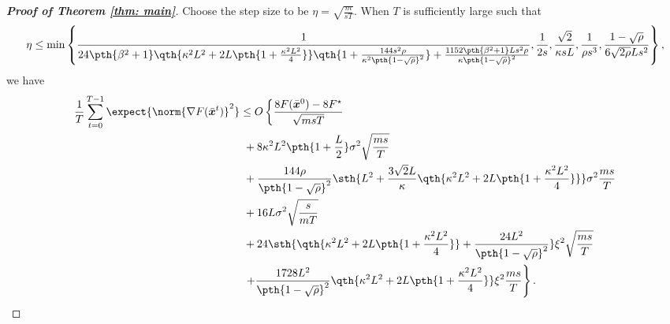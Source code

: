 \documentclass[letterpaper, 10 pt, conference]{ieeeconf}  %
\newcommand{\x}{{\bm x}}
\begin{document}
\begin{proof}[\bf Proof of Theorem \ref{thm: main}]
Choose the step size to be $\eta = \sqrt{\frac{m}{sT}}.$
When $T$ is sufficiently large such that 
\begin{align*}
\eta \le \min \left\{\frac{1}{24\pth{\beta^2 + 1}\qth{\kappa^2 L^2 + 2 L \pth{1 + \frac{\kappa^2 L^2}{4}}} \qth{1 + \frac{144 s^2 \rho}{\kappa^2 \pth{1-\sqrt{\rho}}^2}}+\frac{1152 \pth{\beta^2 + 1} L s^2 \rho}{\kappa\pth{1-\sqrt{\rho}}^2}}, \frac{1}{2s}, 
\frac{\sqrt{2}}{\kappa sL},\frac{1}{\rho s^3},
\frac{1-\sqrt{\rho}}{6\sqrt{2\rho}Ls^2}\right\},
\end{align*}
we have 
\begin{align*}
\frac{1}{T}\sum_{t=0}^{T-1}\expect{\norm{\nabla F(\bar{\x}^t)}^2} 
& \le O \left\{\frac{8F(\bar{\x}^0) - 8 F^\star }{\sqrt{msT}}\right. \\
&~+ 8  \kappa^2 L^2
\pth{1 + \frac{L}{2}} 
 \sigma^2\sqrt{\frac{ms}{T}}\\ 
&~+ \frac{144  \rho  }{\pth{1-\sqrt{\rho}}^2}   \sth{ L^2 + \frac{3\sqrt{2} L}{\kappa}  \qth{\kappa^2 L^2 + 2 L \pth{1 + \frac{\kappa^2 L^2}{4}}}}\sigma^2 \frac{ms}{T}\\
&~ +  16 L \sigma^2\sqrt{\frac{s}{mT}}\\
&~+ 24 \sth{
\qth{\kappa^2 L^2 + 2 L \pth{1 + \frac{\kappa^2 L^2}{4}}}
+ \frac{24 L^2}{\pth{1-\sqrt{\rho}}^2}
} \xi^2 \sqrt{\frac{ms}{T}}\\
&~ \left.+ \frac{1728 L^2 }{\pth{1-\sqrt{\rho}}^2}\qth{\kappa^2 L^2 + 2 L \pth{1 + \frac{\kappa^2 L^2}{4}}} \xi^2\frac{ms}{T}\right\}.
\end{align*}
\end{proof}
\end{document}
